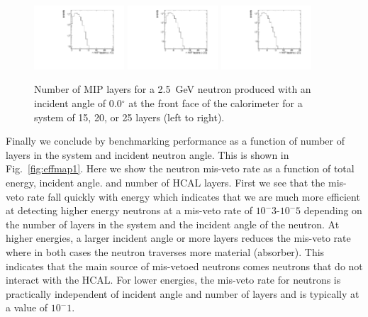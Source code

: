 \begin{figure}[hbtp]
\begin{center}
    \includegraphics[width=0.3\textwidth]{images/hcal/nMIPLayers15_e1d3.pdf}
    \includegraphics[width=0.3\textwidth]{images/hcal/nMIPLayers20_e1d3.pdf}
    \includegraphics[width=0.3\textwidth]{images/hcal/nMIPLayers25_e1d3.pdf}    
    \caption{Number of MIP layers for a 2.5~GeV neutron produced with an incident angle of 0.0$^{\circ}$ at the front face of the calorimeter for a system of 15, 20, or 25 layers (left to right). }
 \label{fig:nmiplayer1d3}
 \end{center}
\end{figure}

Finally we conclude by benchmarking performance as a function of number of layers in the system and incident neutron angle.
This is shown in Fig.~\ref{fig:effmap1}.
Here we show the neutron mis-veto rate as a function of total energy, incident angle. and number of HCAL layers.  
First we see that the mis-veto rate fall quickly with energy which indicates that we are much more efficient at detecting higher energy neutrons at a mis-veto rate of $10^-3$-$10^-5$ depending on the number of layers in the system and the incident angle of the neutron.  
At higher energies, a larger incident angle or more layers reduces the mis-veto rate where in both cases the neutron traverses more material (absorber).
This indicates that the main source of mis-vetoed neutrons comes neutrons that do not interact with the HCAL.  
For lower energies, the mis-veto rate for neutrons is practically independent of incident angle and number of layers and is typically at a value of $10^-1$.  

